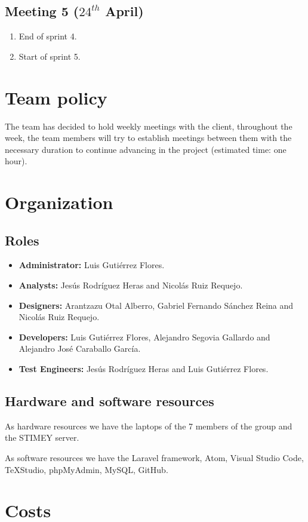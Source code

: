 \subsection{Meeting 5 ($24^{th}$ April)}
\begin{enumerate}
	\item End of sprint 4.
	\item Start of sprint 5.
\end{enumerate}

\section{Team policy}
The team has decided to hold weekly meetings with the client, throughout the week, the team members will try to establish meetings between them with the necessary duration to continue advancing in the project (estimated time: one hour).

\section{Organization}
\subsection{Roles}
\begin{itemize}
	\item \textbf{Administrator:} Luis Gutiérrez Flores.
	\item \textbf{Analysts:} Jesús Rodríguez Heras and Nicolás Ruiz Requejo.
	\item \textbf{Designers:} Arantzazu Otal Alberro, Gabriel Fernando Sánchez Reina and Nicolás Ruiz Requejo.
	\item \textbf{Developers:} Luis Gutiérrez Flores, Alejandro Segovia Gallardo and Alejandro José Caraballo García.
	\item \textbf{Test Engineers:} Jesús Rodríguez Heras and Luis Gutiérrez Flores.
\end{itemize}

\subsection{Hardware and software resources}
As hardware resources we have the laptops of the 7 members of the group and the STIMEY server.

As software resources we have the Laravel framework, Atom, Visual Studio Code, TeXStudio, phpMyAdmin, MySQL, GitHub.

\section{Costs}

